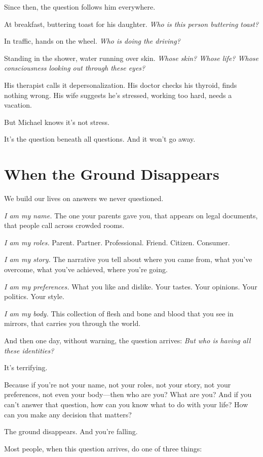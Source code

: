 \documentclass[11pt,twoside]{book}
\begin{document}
Since then, the question follows him everywhere.

At breakfast, buttering toast for his daughter. \emph{Who is this person buttering toast?}

In traffic, hands on the wheel. \emph{Who is doing the driving?}

Standing in the shower, water running over skin. \emph{Whose skin? Whose life? Whose consciousness looking out through these eyes?}

His therapist calls it depersonalization. His doctor checks his thyroid, finds nothing wrong. His wife suggests he's stressed, working too hard, needs a vacation.

But Michael knows it's not stress.

It's the question beneath all questions. And it won't go away.

\section*{When the Ground Disappears}

We build our lives on answers we never questioned.

\emph{I am my name.} The one your parents gave you, that appears on legal documents, that people call across crowded rooms.

\emph{I am my roles.} Parent. Partner. Professional. Friend. Citizen. Consumer.

\emph{I am my story.} The narrative you tell about where you came from, what you've overcome, what you've achieved, where you're going.

\emph{I am my preferences.} What you like and dislike. Your tastes. Your opinions. Your politics. Your style.

\emph{I am my body.} This collection of flesh and bone and blood that you see in mirrors, that carries you through the world.

And then one day, without warning, the question arrives: \emph{But who is having all these identities?}

It's terrifying.

Because if you're not your name, not your roles, not your story, not your preferences, not even your body—then who are you? What are you? And if you can't answer that question, how can you know what to do with your life? How can you make any decision that matters?

The ground disappears. And you're falling.

Most people, when this question arrives, do one of three things:
\end{document}
